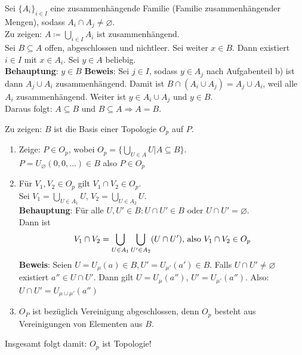 \begin{problem}[1c]
  Sei \( {\{ A_i \}}_{i \in I} \) eine zusammenhängende Familie (Familie zusammenhängender Mengen), sodass 
  \( A_i \cap A_j \neq \varnothing \). \\ 
  Zu zeigen: \( A \coloneqq \bigcup_{i \in I} A_i \) ist zusammenhängend. \\
  Sei \( B \subseteq A \) offen, abgeschlossen und nichtleer. Sei weiter \( x \in B \). Dann existiert \( i \in I \) mit
  \( x \in A_i \). Sei \( y \in A \) beliebig. \\
  \textbf{Behauptung}: \( y \in B \)
  \textbf{Beweis}: Sei \( j \in I \), sodass \( y \in A_j \) nach Aufgabenteil b) ist dann \( A_j \cup A_i \) zusammenhängend. Damit ist \( B \cap (A_i \cup A_j) = A_j \cup A_i \), weil alle \( A_i \) zusammenhängend.
  Weiter ist \( y \in A_i \cup A_j \) und \( y \in B \). \\
  Daraus folgt: \( A \subseteq B \) und \( B \subseteq A \Rightarrow A = B \).
\end{problem}

\begin{problem}[2a]
  Zu zeigen: \( B \) ist die Basis einer Topologie \( O_p \) auf \( P \).
  \begin{enumerate}
    \item Zeige: \( P \in O_p \), wobei \( O_p = \{ \bigcup_{U \in A} U | A \subseteq B \} \). \\
    \( P = U_{\varnothing} (0,0, \dots) \in B \) also \( P \in O_p \)
    \item Für \( V_1,V_2 \in O_p \) gilt \( V_1 \cap V_2 \in O_p \). \\
    Sei \( V_1 = \bigcup_{U \in A_1} U \), \( V_2 = \bigcup_{U \in A_2} U \). \\
    \textbf{Behauptung}: Für alle \( U,U' \in B: U \cap U' \in B \) oder \( U \cap U' = \varnothing \). \\
    Dann ist 
    \begin{equation*}
      V_1 \cap V_2 = \bigcup_{U \in A_1} \bigcup_{U' \in A_2} (U \cap U')\text{, also } V_1 \cap V_2 \in O_p \\
    \end{equation*}
    \textbf{Beweis}: Seien \( U = U_{\mu} (a) \in B , U' = U_{\mu'} (a') \in B \). Falls \( U \cap U' \neq \varnothing \) existiert \( a'' \in U \cap U' \). Dann gilt \( U = U_{\mu}(a'') \), \( U' = U_{\mu'}(a'') \). Also: \\
    \( U \cap U' = U_{\mu \cup \mu'} (a'') \)
    \item \( O_P \) ist bezüglich Vereinigung abgeschlossen, denn \( O_p \) besteht aus Vereinigungen von Elementen aus \( B \). \\
  \end{enumerate}
  Insgesamt folgt damit: \( O_p \) ist Topologie! 
\end{problem}

